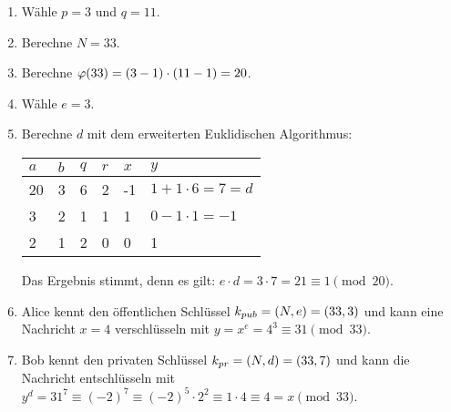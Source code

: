 \begin{example}\mbox{}
  \begin{enumerate}
    \item Wähle $p = 3$ und $q = 11$.
    \item Berechne $N = 33$.
    \item Berechne $\varphi(33) = (3 - 1) \cdot (11 - 1) = 20$.
    \item Wähle $e = 3$.
    \item Berechne $d$ mit dem erweiterten Euklidischen Algorithmus:
          \begin{center}
            \begin{tabular}{|l|l|l|l|l|l|}
              \hline
              $a$ & $b$ & $q$ & $r$ & $x$ & $y$                     \\ \hline
              20  & 3   & 6   & 2   & -1  & $1 + 1 \cdot 6 = 7 = d$ \\ \hline
              3   & 2   & 1   & 1   & 1   & $0 - 1 \cdot 1 = -1$    \\ \hline
              2   & 1   & 2   & 0   & 0   & 1                       \\ \hline
            \end{tabular}
          \end{center}
          Das Ergebnis stimmt, denn es gilt: $e \cdot d = 3 \cdot 7 = 21 \equiv 1 \pmod{20}$.
    \item Alice kennt den öffentlichen Schlüssel $k_{pub} = (N,e) = (33,3)$ und kann eine
          Nachricht $x = 4$ verschlüsseln mit $y = x^e = 4^3 \equiv 31 \pmod{33}$.
    \item Bob kennt den privaten Schlüssel $k_{pr} = (N,d) = (33,7)$ und kann die Nachricht
          entschlüsseln mit $y^d = 31^7 \equiv (-2)^7 \equiv (-2)^5 \cdot 2^2 \equiv
            1 \cdot 4 \equiv 4 = x \pmod{33}$. \qedhere
  \end{enumerate}
\end{example}